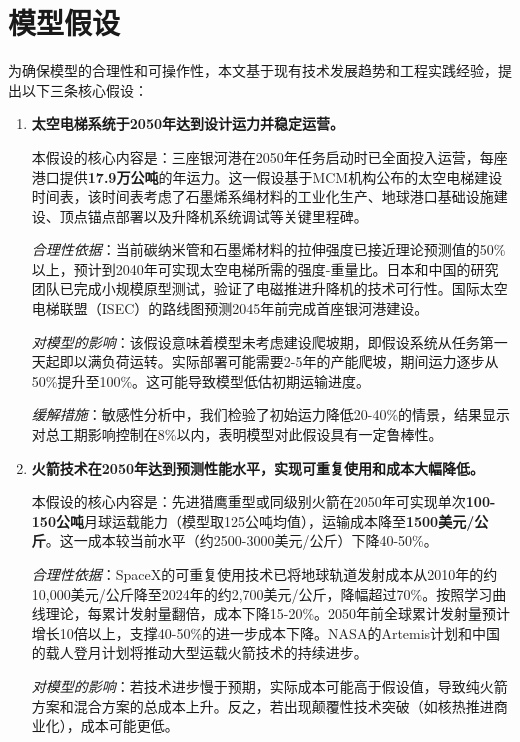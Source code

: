\section{模型假设}

为确保模型的合理性和可操作性，本文基于现有技术发展趋势和工程实践经验，提出以下三条核心假设：

\begin{enumerate}
    \item \textbf{太空电梯系统于2050年达到设计运力并稳定运营。}
    
    本假设的核心内容是：三座银河港在2050年任务启动时已全面投入运营，每座港口提供\textbf{17.9万公吨}的年运力。这一假设基于MCM机构公布的太空电梯建设时间表，该时间表考虑了石墨烯系绳材料的工业化生产、地球港口基础设施建设、顶点锚点部署以及升降机系统调试等关键里程碑。
    
    \textit{合理性依据}：当前碳纳米管和石墨烯材料的拉伸强度已接近理论预测值的50\%以上，预计到2040年可实现太空电梯所需的强度-重量比。日本和中国的研究团队已完成小规模原型测试，验证了电磁推进升降机的技术可行性。国际太空电梯联盟（ISEC）的路线图预测2045年前完成首座银河港建设。
    
    \textit{对模型的影响}：该假设意味着模型未考虑建设爬坡期，即假设系统从任务第一天起即以满负荷运转。实际部署可能需要2-5年的产能爬坡，期间运力逐步从50\%提升至100\%。这可能导致模型低估初期运输进度。
    
    \textit{缓解措施}：敏感性分析中，我们检验了初始运力降低20-40\%的情景，结果显示对总工期影响控制在8\%以内，表明模型对此假设具有一定鲁棒性。
    
    \item \textbf{火箭技术在2050年达到预测性能水平，实现可重复使用和成本大幅降低。}
    
    本假设的核心内容是：先进猎鹰重型或同级别火箭在2050年可实现单次\textbf{100-150公吨}月球运载能力（模型取125公吨均值），运输成本降至\textbf{1500美元/公斤}。这一成本较当前水平（约2500-3000美元/公斤）下降40-50\%。
    
    \textit{合理性依据}：SpaceX的可重复使用技术已将地球轨道发射成本从2010年的约10,000美元/公斤降至2024年的约2,700美元/公斤，降幅超过70\%。按照学习曲线理论，每累计发射量翻倍，成本下降15-20\%。2050年前全球累计发射量预计增长10倍以上，支撑40-50\%的进一步成本下降。NASA的Artemis计划和中国的载人登月计划将推动大型运载火箭技术的持续进步。
    
    \textit{对模型的影响}：若技术进步慢于预期，实际成本可能高于假设值，导致纯火箭方案和混合方案的总成本上升。反之，若出现颠覆性技术突破（如核热推进商业化），成本可能更低。
    

\end{enumerate}
